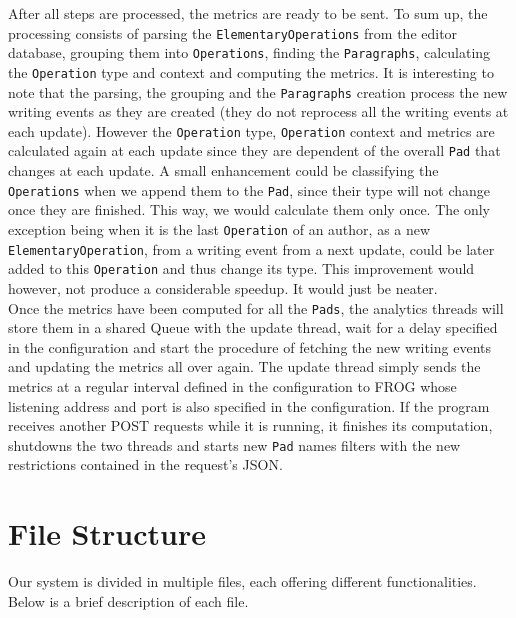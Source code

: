 \documentclass[a4, twocolumn, 12pt]{article}
\begin{document}
After all steps are processed, the metrics are ready to be sent. To sum up, the processing consists of parsing the \texttt{ElementaryOperations} from the editor database, grouping them into \texttt{Operations}, finding the \texttt{Paragraphs}, calculating the \texttt{Operation} type and context and computing the metrics. It is interesting to note that the parsing, the grouping and the \texttt{Paragraphs} creation process the new writing events as they are created (they do not reprocess all the writing events at each update). However the \texttt{Operation} type, \texttt{Operation} context and metrics are calculated again at each update since they are dependent of the overall \texttt{Pad} that changes at each update. A small enhancement could be classifying the \texttt{Operations} when we append them to the \texttt{Pad}, since their type will not change once they are finished. This way, we would calculate them only once. The only exception being when it is the last \texttt{Operation} of an author, as a new \texttt{ElementaryOperation}, from a writing event from a next update, could be later added to this \texttt{Operation} and thus change its type. This improvement would however, not produce a considerable speedup. It would just be neater.\\
Once the metrics have been computed for all the \texttt{Pads}, the analytics threads will store them in a shared Queue with the update thread, wait for a delay specified in the configuration and start the procedure of fetching the new writing events and updating the metrics all over again. The update thread simply sends the metrics at a regular interval defined in the configuration to FROG whose listening address and port is also specified in the configuration. If the program receives another POST requests  while it is running, it finishes its computation, shutdowns the two threads and starts new \texttt{Pad} names filters with the new restrictions contained in the request’s JSON.

\section{File Structure}

Our system is divided in multiple files, each offering different functionalities. Below is a brief description of each file.
\end{document}
